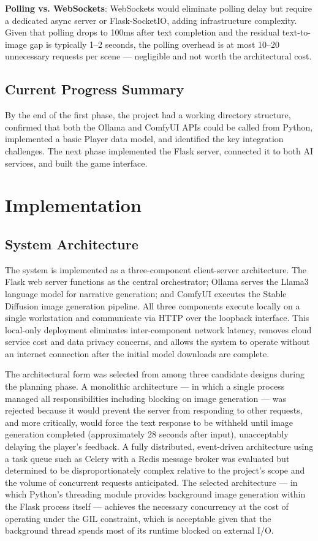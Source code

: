 \documentclass[12pt,a4paper]{article}
\begin{document}
\textbf{Polling vs. WebSockets}: WebSockets would eliminate polling delay but require a dedicated async server or Flask-SocketIO, adding infrastructure complexity. Given that polling drops to 100ms after text completion and the residual text-to-image gap is typically 1--2 seconds, the polling overhead is at most 10--20 unnecessary requests per scene --- negligible and not worth the architectural cost.

\subsection{Current Progress Summary}

By the end of the first phase, the project had a working directory structure, confirmed that both the Ollama and ComfyUI APIs could be called from Python, implemented a basic Player data model, and identified the key integration challenges. The next phase implemented the Flask server, connected it to both AI services, and built the game interface.

    \section{Implementation}

    \subsection{System Architecture}

The system is implemented as a three-component client-server architecture. The Flask web server functions as the central orchestrator; Ollama serves the Llama3 language model for narrative generation; and ComfyUI executes the Stable Diffusion image generation pipeline. All three components execute locally on a single workstation and communicate via HTTP over the loopback interface. This local-only deployment eliminates inter-component network latency, removes cloud service cost and data privacy concerns, and allows the system to operate without an internet connection after the initial model downloads are complete.

The architectural form was selected from among three candidate designs during the planning phase. A monolithic architecture --- in which a single process managed all responsibilities including blocking on image generation --- was rejected because it would prevent the server from responding to other requests, and more critically, would force the text response to be withheld until image generation completed (approximately 28 seconds after input), unacceptably delaying the player's feedback. A fully distributed, event-driven architecture using a task queue such as Celery with a Redis message broker was evaluated but determined to be disproportionately complex relative to the project's scope and the volume of concurrent requests anticipated. The selected architecture --- in which Python's threading module provides background image generation within the Flask process itself --- achieves the necessary concurrency at the cost of operating under the GIL constraint, which is acceptable given that the background thread spends most of its runtime blocked on external I/O.
\end{document}
